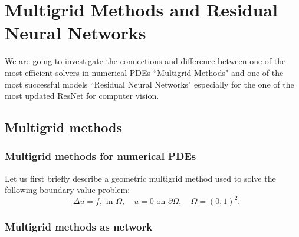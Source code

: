 \chapter{Multigrid Methods and Residual Neural Networks}
We are going to investigate the connections and difference between one of the most efficient solvers in numerical PDEs ``Multigrid Methods" and one of the most successful models ``Residual Neural Networks" especially for the one of the most updated ResNet \cite{he2016identity} for computer vision.



\section{Multigrid methods}\label{cs:mg}
\subsection{Multigrid methods for numerical PDEs}



Let us first briefly describe a geometric multigrid method used to
solve the following boundary value problem:
\begin{equation}
\label{laplace}
-\Delta u = f,  \mbox{ in } \Omega,\quad
u =0  \mbox{ on } \partial\Omega,\quad
\Omega=(0,1)^2.
\end{equation}


\subsection{Multigrid methods as network}


